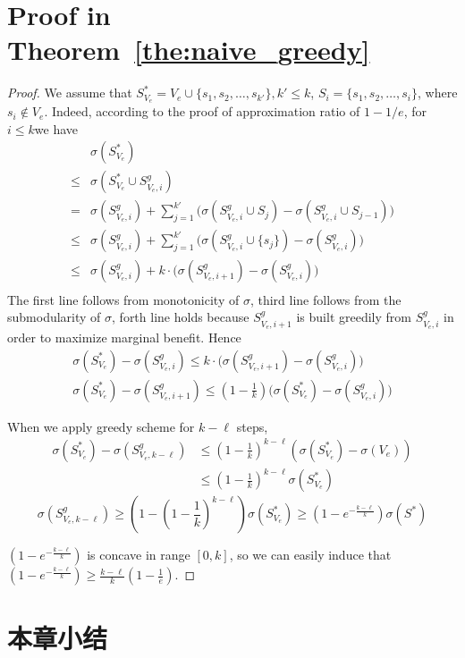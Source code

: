 \section{Proof in Theorem~\ref{the:naive_greedy}}\label{app:e_submodular_app}
\begin{proof}
We assume that $S^*_{V_e}=V_e \cup \{s_1,s_2,\dots,s_{k'}\}, k'\leq k$, $S_i = \{s_1,s_2,\dots,s_i\}$,
where $s_i \not\in V_e$.
Indeed, according to the proof of approximation ratio of $1-1/e$,
for $i\leq k$we have
\begin{equation*}
\begin{array}{ll}
&\sigma(S^*_{V_e})\\
\leq & \sigma(S^*_{V_e} \cup S^g_{V_e,i})\\
= & \sigma(S^g_{V_e,i}) +
	\sum_{j=1}^{k'} \big( \sigma(S^g_{V_e,i} \cup S_j) - 	
	\sigma(S^g_{V_e,i} \cup S_{j-1})\big)\\
\leq & \sigma(S^g_{V_e,i}) +
	\sum_{j=1}^{k'} \big( \sigma(S^g_{V_e,i} \cup \{s_j\}) - 	
	\sigma(S^g_{V_e,i})\big)\\
\leq & \sigma(S^g_{V_e,i}) +
	k\cdot \big( \sigma(S^g_{V_e,i+1})-\sigma(S^g_{V_e,i})\big)\\
\end{array}
\end{equation*}
The first line follows from monotonicity of $\sigma$,
third line follows from the submodularity of $\sigma$,
forth line holds because $S^g_{V_e,i+1}$ is built greedily from
$S^g_{V_e,i}$ in order to maximize marginal benefit.
Hence
\begin{equation*}
\begin{array}{ll}
\sigma(S^*_{V_e}) - \sigma(S^g_{V_e,i}) \leq
k\cdot \big( \sigma(S^g_{V_e,i+1})-\sigma(S^g_{V_e,i})\big) \\
\sigma(S^*_{V_e}) - \sigma(S^g_{V_e,i+1}) \leq
(1-\frac{1}{k}) \big( \sigma(S^*_{V_e}) - \sigma(S^g_{V_e,i}) \big)
\end{array}
\end{equation*}

When we apply greedy scheme for $k-\ell$ steps,
\begin{equation*}
\begin{array}{ll}
\sigma(S^*_{V_e}) - \sigma(S^g_{V_e,k-\ell})
&\leq (1-\frac{1}{k})^{k-\ell} (\sigma(S^*_{V_e}) - \sigma(V_e))\\
&\leq (1-\frac{1}{k})^{k-\ell} \sigma(S^*_{V_e})
\end{array}
\end{equation*}
$$\sigma(S^g_{V_e,k-\ell})
\geq (1-(1-\frac{1}{k})^{k-\ell}) \sigma(S^*_{V_e})
\geq (1-e^{-\frac{k-\ell}{k}}) \sigma(S^*)$$

$(1-e^{-\frac{k-\ell}{k}})$ is concave in range $[0,k]$,
so we can easily induce that $(1-e^{-\frac{k-\ell}{k}}) \geq \frac{k-\ell}{k}(1-\frac{1}{e})$.
\end{proof}


\section{本章小结}








